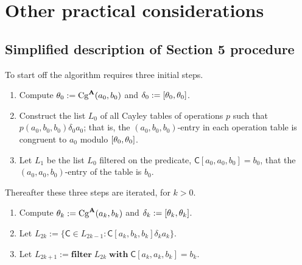   
  







  \section{Other practical considerations}
  \subsection{Simplified description of Section 5 procedure}
  To start off the algorithm requires three initial steps.
  \begin{enumerate}
    \item Compute $\theta_0 := \operatorname{Cg}^{\mathbf{A}}(a_0, b_0)$ and $\delta_0 := [\theta_0, \theta_0]$.
    \item Construct the list $L_0$ of all Cayley tables of operations $p$ 
    such that $p(a_0, b_0, b_0) \mathrel{\delta_0} a_0$; that is, the 
    $(a_0, b_0, b_0)$-entry in each operation table is congruent to $a_0$ modulo $[\theta_0, \theta_0]$.
    \item Let $L_1$ be the list $L_0$ filtered on the predicate,
    $\mathsf{C}[a_0, a_0, b_0] = b_0$, that the $(a_0, a_0, b_0)$-entry of 
    the table is $b_0$.
  \end{enumerate}
  Thereafter these three steps are iterated, for $k> 0$.
  \begin{enumerate}
    \item Compute $\theta_{k} := \operatorname{Cg}^{\mathbf{A}}(a_k, b_k)$ and $\delta_{k} := [\theta_{k}, \theta_{k}]$.
    \item Let $L_{2k} := \{\mathsf{C} \in L_{2k-1} \colon \mathsf{C}[a_k, b_k, b_k] \mathrel{\delta_{k}} a_k \}$.
    \item Let $L_{2k+1} := \mathbf{filter} \; L_{2k} \; \mathbf{with} \; \mathsf{C}[a_k, a_k, b_k] = b_k$.
  \end{enumerate}
